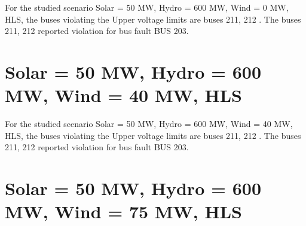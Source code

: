 \documentclass[10pt]{report}
\begin{document}
For the studied scenario Solar = 50 MW, Hydro = 600 MW, Wind = 0 MW, HLS, the buses violating the Upper voltage limits are buses 211, 212 .
The buses 211, 212 reported violation for bus fault BUS 203.
\begin{table}[H]
\caption{Contingencies reporting bus voltages greater than emergency voltage of 1.1 PU for scenario Solar = 50 MW, Hydro = 600 MW, Wind = 0 MW, HLS}
\label{HVSolar50MWHydro600MWWind0MWHLS}
\centering
{}
\end{table}

\section{Solar = 50 MW, Hydro = 600 MW, Wind = 40 MW, HLS}
For the studied scenario Solar = 50 MW, Hydro = 600 MW, Wind = 40 MW, HLS, the buses violating the Upper voltage limits are buses 211, 212 .
The buses 211, 212 reported violation for bus fault BUS 203.
\begin{table}[H]
\caption{Contingencies reporting bus voltages greater than emergency voltage of 1.1 PU for scenario Solar = 50 MW, Hydro = 600 MW, Wind = 40 MW, HLS}
\label{HVSolar50MWHydro600MWWind40MWHLS}
\centering
{}
\end{table}

\section{Solar = 50 MW, Hydro = 600 MW, Wind = 75 MW, HLS}
\end{document}
